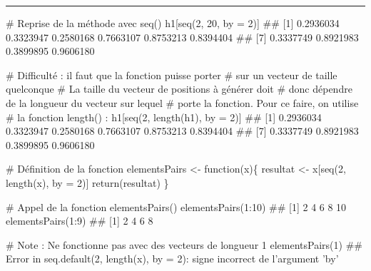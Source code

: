 \documentclass[12pt,twosided, notitlepage]{book}
\newenvironment{Shaded}{}{}
\newcommand{\KeywordTok}[1]{\textcolor[rgb]{0.00,0.00,1.00}{#1}}
\newcommand{\DataTypeTok}[1]{#1}
\newcommand{\DecValTok}[1]{#1}
\newcommand{\StringTok}[1]{\textcolor[rgb]{0.00,0.50,0.50}{#1}}
\newcommand{\CommentTok}[1]{\textcolor[rgb]{0.00,0.50,0.00}{#1}}
\newcommand{\ControlFlowTok}[1]{\textcolor[rgb]{0.00,0.00,1.00}{#1}}
\newcommand{\OperatorTok}[1]{#1}
\newcommand{\NormalTok}[1]{#1}
\newif \ifsol
\renewenvironment{Shaded}{\begin{snugshade}}{\end{snugshade}}
\begin{document}
\begin{enumerate}
  \ifsol  \textbf{Indication} Généralisez la réponse à la question
  précédente en utilisant notamment la fonction \texttt{length()}.\fi 

  \ifsol 

  \begin{center} \rule{0.5\linewidth}{\linethickness}\end{center}

\begin{Shaded}
\begin{Highlighting}[]
\CommentTok{# Reprise de la méthode avec seq()}
\NormalTok{h1[}\KeywordTok{seq}\NormalTok{(}\DecValTok{2}\NormalTok{, }\DecValTok{20}\NormalTok{, }\DataTypeTok{by =} \DecValTok{2}\NormalTok{)]}
\NormalTok{  ##  [1] 0.2936034 0.3323947 0.2580168 0.7663107 0.8753213 0.8394404}
\NormalTok{  ##  [7] 0.3337749 0.8921983 0.3899895 0.9606180}

\CommentTok{# Difficulté : il faut que la fonction puisse porter}
\CommentTok{# sur un vecteur de taille quelconque}
\CommentTok{# La taille du vecteur de positions à générer doit}
\CommentTok{# donc dépendre de la longueur du vecteur sur lequel}
\CommentTok{# porte la fonction. Pour ce faire, on utilise }
\CommentTok{# la fonction length() :}
\NormalTok{h1[}\KeywordTok{seq}\NormalTok{(}\DecValTok{2}\NormalTok{, }\KeywordTok{length}\NormalTok{(h1), }\DataTypeTok{by =} \DecValTok{2}\NormalTok{)]}
\NormalTok{  ##  [1] 0.2936034 0.3323947 0.2580168 0.7663107 0.8753213 0.8394404}
\NormalTok{  ##  [7] 0.3337749 0.8921983 0.3899895 0.9606180}

\CommentTok{# Définition de la fonction}
\NormalTok{elementsPairs <-}\StringTok{ }\ControlFlowTok{function}\NormalTok{(x)\{}
\NormalTok{  resultat <-}\StringTok{ }\NormalTok{x[}\KeywordTok{seq}\NormalTok{(}\DecValTok{2}\NormalTok{, }\KeywordTok{length}\NormalTok{(x), }\DataTypeTok{by =} \DecValTok{2}\NormalTok{)]}
  \KeywordTok{return}\NormalTok{(resultat)}
\NormalTok{\}}

\CommentTok{# Appel de la fonction elementsPairs()}
\KeywordTok{elementsPairs}\NormalTok{(}\DecValTok{1}\OperatorTok{:}\DecValTok{10}\NormalTok{)}
\NormalTok{  ## [1]  2  4  6  8 10}
\KeywordTok{elementsPairs}\NormalTok{(}\DecValTok{1}\OperatorTok{:}\DecValTok{9}\NormalTok{)}
\NormalTok{  ## [1] 2 4 6 8}

\CommentTok{# Note : Ne fonctionne pas avec des vecteurs de longueur 1}
\KeywordTok{elementsPairs}\NormalTok{(}\DecValTok{1}\NormalTok{)}
\NormalTok{  ## Error in seq.default(2, length(x), by = 2): signe incorrect de l'argument 'by'}
\end{Highlighting}
\end{Shaded}


\end{enumerate}
\end{document}
